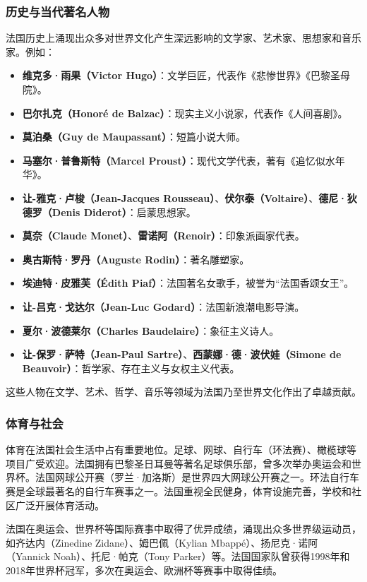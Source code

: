 \subsubsection{历史与当代著名人物}
法国历史上涌现出众多对世界文化产生深远影响的文学家、艺术家、思想家和音乐家。例如：
\begin{itemize}
  \item \textbf{维克多·雨果（Victor Hugo）}：文学巨匠，代表作《悲惨世界》《巴黎圣母院》。
  \item \textbf{巴尔扎克（Honoré de Balzac）}：现实主义小说家，代表作《人间喜剧》。
  \item \textbf{莫泊桑（Guy de Maupassant）}：短篇小说大师。
  \item \textbf{马塞尔·普鲁斯特（Marcel Proust）}：现代文学代表，著有《追忆似水年华》。
  \item \textbf{让-雅克·卢梭（Jean-Jacques Rousseau）}、\textbf{伏尔泰（Voltaire）}、\textbf{德尼·狄德罗（Denis Diderot）}：启蒙思想家。
  \item \textbf{莫奈（Claude Monet）}、\textbf{雷诺阿（Renoir）}：印象派画家代表。
  \item \textbf{奥古斯特·罗丹（Auguste Rodin）}：著名雕塑家。
  \item \textbf{埃迪特·皮雅芙（Édith Piaf）}：法国著名女歌手，被誉为“法国香颂女王”。
  \item \textbf{让-吕克·戈达尔（Jean-Luc Godard）}：法国新浪潮电影导演。
  \item \textbf{夏尔·波德莱尔（Charles Baudelaire）}：象征主义诗人。
  \item \textbf{让-保罗·萨特（Jean-Paul Sartre）}、\textbf{西蒙娜·德·波伏娃（Simone de Beauvoir）}：哲学家、存在主义与女权主义代表。
\end{itemize}
这些人物在文学、艺术、哲学、音乐等领域为法国乃至世界文化作出了卓越贡献。

\subsubsection{体育与社会}
体育在法国社会生活中占有重要地位。足球、网球、自行车（环法赛）、橄榄球等项目广受欢迎。法国拥有巴黎圣日耳曼等著名足球俱乐部，曾多次举办奥运会和世界杯。法国网球公开赛（罗兰·加洛斯）是世界四大网球公开赛之一。环法自行车赛是全球最著名的自行车赛事之一。法国重视全民健身，体育设施完善，学校和社区广泛开展体育活动。

法国在奥运会、世界杯等国际赛事中取得了优异成绩，涌现出众多世界级运动员，如齐达内（Zinedine Zidane）、姆巴佩（Kylian Mbappé）、扬尼克·诺阿（Yannick Noah）、托尼·帕克（Tony Parker）等。法国国家队曾获得1998年和2018年世界杯冠军，多次在奥运会、欧洲杯等赛事中取得佳绩。

